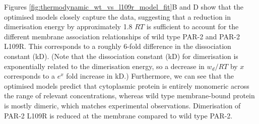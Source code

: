 \documentclass[12pt]{"report"}
\begin{document}
Figures \ref{fig:thermodynamic_wt_vs_l109r_model_fit}B and D show that the optimised models closely capture the data, suggesting that a reduction in dimerisation energy by approximately 1.8 $RT$ is sufficient to account for the different membrane association relationships of wild type PAR-2 and PAR-2 L109R. This corresponds to a roughly 6-fold difference in the dissociation constant (kD). (Note that the dissociation constant (kD) for dimerisation is exponentially related to the dimerisation energy, so a decrease in $w_d / RT$ by $x$ corresponds to a $e^x$ fold increase in kD.) Furthermore, we can see that the optimised models predict that cytoplasmic protein is entirely monomeric across the range of relevant concentrations, whereas wild type membrane-bound protein is mostly dimeric, which matches experimental observations. Dimerisation of PAR-2 L109R is reduced at the membrane compared to wild type PAR-2.

\end{document}
